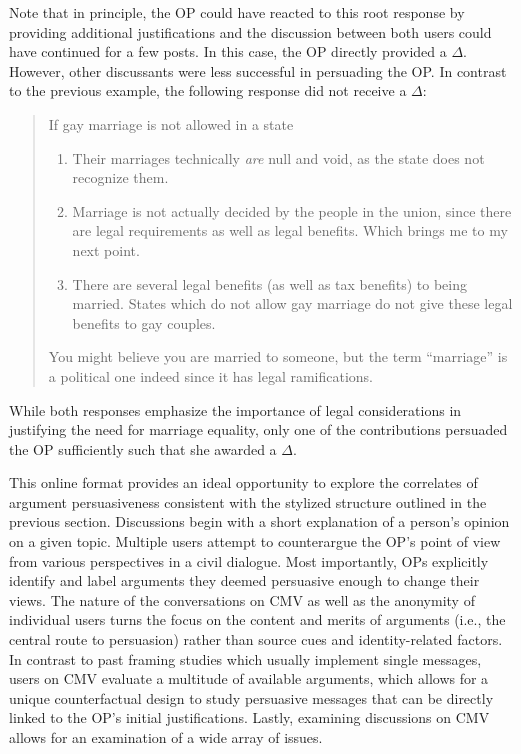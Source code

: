 Note that in principle, the OP could have reacted to this root response by providing additional justifications and the discussion between both users could have continued for a few posts. In this case, the OP directly provided a $\Delta$. However, other discussants were less successful in persuading the OP. In contrast to the previous example, the following response did not receive a $\Delta$:
\begin{quote}\singlespacing
If gay marriage is not allowed in a state
\begin{enumerate}
\item Their marriages technically \textit{are} null and void, as the state does not recognize them.
\item Marriage is not actually decided by the people in the union, since there are legal requirements as well as legal benefits. Which brings me to my next point.
\item There are several legal benefits (as well as tax benefits) to being married. States which do not allow gay marriage do not give these legal benefits to gay couples.      
\end{enumerate}
You might believe you are married to someone, but the term ``marriage'' is a political one indeed since it has legal ramifications.
\end{quote}
While both responses emphasize the importance of legal considerations in justifying the need for marriage equality, only one of the contributions persuaded the OP sufficiently such that she awarded a $\Delta$. 

This online format provides an ideal opportunity to explore the correlates of argument persuasiveness consistent with the stylized structure outlined in the previous section. Discussions begin with a short explanation of a person's opinion on a given topic. Multiple users attempt to counterargue the OP's point of view from various perspectives in a civil dialogue. Most importantly, OPs explicitly identify and label arguments they deemed persuasive enough to change their views. The nature of the conversations on CMV as well as the anonymity of individual users turns the focus on the content and merits of arguments (i.e., the central route to persuasion) rather than source cues and identity-related factors. In contrast to past framing studies which usually implement single messages, users on CMV evaluate a multitude of available arguments, which allows for a unique counterfactual design to study persuasive messages that can be directly linked to the OP's initial justifications. Lastly, examining discussions on CMV allows for an examination of a wide array of issues.

